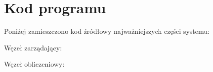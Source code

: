 \chapter[Dodatek B]{Kod programu}\label{DodatekKod}
Poniżej zamieszczono kod źródłowy najważniejszych części systemu:

Węzeł zarządający:




Węzeł obliczeniowy:




